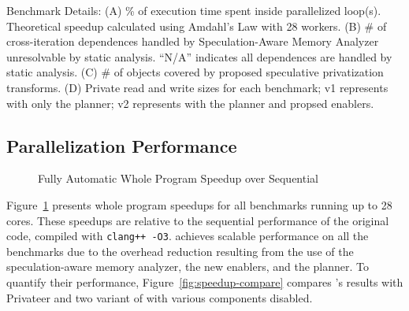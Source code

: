 \begin{table}[h]
  \centering
  
  \caption{
    Benchmark Details:
    (A) \% of
    execution time spent inside parallelized loop(s). Theoretical speedup
    calculated using Amdahl's Law with 28 workers.
    (B) \# of cross-iteration dependences
    handled by Speculation-Aware Memory Analyzer unresolvable by
    static analysis. ``N/A'' indicates all dependences are handled by static analysis.
    (C) \# of objects covered by proposed speculative
    privatization transforms.
    (D) Private read and write sizes for each benchmark; v1 represents
    \name with only the planner; v2 represents \name with
    the planner and propsed enablers.}
  \label{tab:benchmark-list}
    \vspace{-5pt}
\end{table}

\subsection{Parallelization Performance}

\begin{figure}[ht]
  \centering
  \caption{Fully Automatic Whole Program Speedup over Sequential}
  \label{fig:multi-core-scale}
\end{figure}

Figure~\ref{fig:multi-core-scale} presents whole program speedups for
all benchmarks running up to 28 cores. These speedups are
relative to the sequential performance of the original code, compiled
with \texttt{clang++ -O3}. \name achieves scalable performance on all the
benchmarks due to the overhead reduction resulting from the use
of the speculation-aware memory analyzer, the new enablers, and the planner.
To quantify their performance, Figure~\ref{fig:speedup-compare} compares
\namensp's results with Privateer and two variant of \name with various
components disabled.

